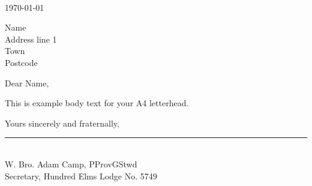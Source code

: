 \documentclass{lodgebrand}
\begin{document}
\vspace*{10mm}

\small\color{textgray}
\begin{minipage}{0.55\textwidth}
\LodgeContacts\\[2mm]
\LodgeAddress
\end{minipage}
\hfill
\begin{minipage}{0.35\textwidth}
\raggedleft \today
\end{minipage}

\vspace{8mm}
\normalsize
{Name}\\
{Address line 1}\\
{Town}\\
{Postcode}

\vspace{6mm}
Dear {Name},

This is example body text for your A4 letterhead.

\bigskip
Yours sincerely and fraternally,\\[12mm]
\rule{45mm}{0.4pt}\\
W. Bro. Adam Camp, PProvGStwd\\
Secretary, Hundred Elms Lodge No. 5749
\end{document}
